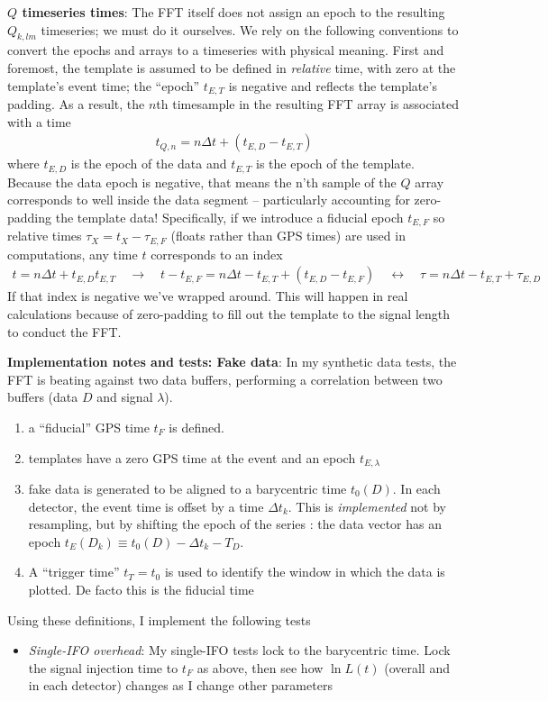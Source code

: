 \documentclass[twocolumn,prd,nofootinbib]{revtex4}
\begin{document}
\begin{widetext}
\noindent \textbf{$Q$ timeseries times}: The FFT itself does not assign an epoch to the resulting $Q_{k,lm}$
timeseries; we must do it ourselves.  
%
We rely on the following conventions to convert the epochs and arrays to a timeseries with physical meaning.  
%
First and foremost,  the template is assumed to be defined in
\emph{relative} time, with zero at the template's event time; the ``epoch'' $t_{E,T}$ is negative and reflects the
template's padding.  As a result, the $n$th timesample in the resulting FFT array is associated with a time
\begin{eqnarray}
t_{Q,n} = n \Delta t + (t_{E,D} - t_{E,T})
\end{eqnarray}
where $t_{E,D}$ is the epoch of the data and $t_{E,T}$ is the epoch of the template.  
%
Because the data epoch is negative, that means the n'th sample of the $Q$ array corresponds to  well inside the data
segment -- particularly accounting for zero-padding the template data!    Specifically, if we introduce a fiducial epoch
$t_{E,F}$ so relative times  $\tau_X =t_X - \tau_{E,F}$ (floats rather than GPS times) are used in computations, any time $t$ corresponds to an index
\begin{eqnarray}
t=n\Delta t + t_{E,D} t_{E,T} \quad \rightarrow \quad
t-t_{E,F} = n \Delta t - t_{E,T} + (t_{E,D}  - t_{E,F}) \quad \leftrightarrow  \quad 
\tau  =  n \Delta t - t_{E,T} + \tau_{E,D}
\end{eqnarray}
If that index is negative we've wrapped around.   This will happen in real calculations because of zero-padding to fill
out the template to the signal length to conduct the FFT.


\noindent \textbf{Implementation notes and tests: Fake data}:
In my synthetic data tests, the FFT is beating against two data buffers, performing a correlation between two buffers (data $D$ and signal $\lambda$).
\begin{enumerate}
\item  a ``fiducial'' GPS time $t_F$ is defined.
\item templates have a zero GPS time at the event and an epoch $t_{E,\lambda}$

\item fake data is generated  to be aligned to a barycentric time $t_0(D)$.  In each detector, the event time is offset
  by a time $\Delta t_k$.  This is \emph{implemented} not by
  resampling, but by shifting the epoch of the series : the data vector has an epoch $t_{E}(D_k)\equiv t_{0}(D) - \Delta
  t_k - T_D$.
\item A ``trigger time''  $t_T = t_0$ is used to identify the window in which the data is plotted. De facto this is the
  fiducial time
\end{enumerate}
%
Using these definitions, I implement the following tests
\begin{itemize}
\item \emph{Single-IFO overhead}: My single-IFO tests lock to the barycentric time. Lock the signal injection time to $t_F$ as above, then see how $\ln L(t)$ (overall and
  in each detector) changes as I change other parameters


\end{itemize}
\end{widetext}
\end{document}
